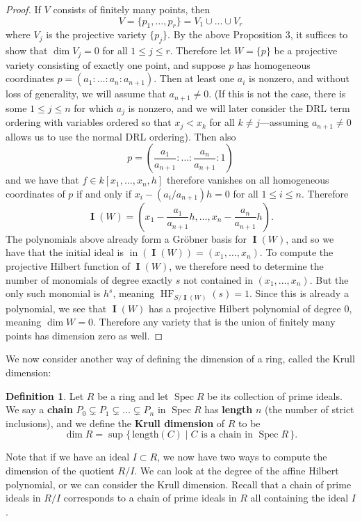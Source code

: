 \documentclass[11pt]{article}
\DeclareMathOperator{\Spec}{Spec}
\DeclareMathOperator{\HF}{HF}
\DeclareMathOperator{\init}{in}
\DeclareMathOperator{\I}{\mathbf{I}}
\theoremstyle{definition}
\newtheorem{definition}{Definition}
\begin{document}
\begin{proof}
	If $V$ consists of finitely many points, then \[ V = \{p_1, \dots, p_r\} = V_1 \cup \dots \cup V_r \] where $V_j$ is the projective variety $\{p_j\}$. By the above Proposition 3, it suffices to show that $\dim V_j = 0$ for all $1 \leq j \leq r$. Therefore let $W = \{p\}$ be a projective variety consisting of exactly one point, and suppose $p$ has homogeneous coordinates $p = (a_1: \dots: a_n: a_{n+1})$. Then at least one $a_i$ is nonzero, and without loss of generality, we will assume that $a_{n + 1} \neq 0$. (If this is not the case, there is some $1 \leq j \leq n$ for which $a_j$ is nonzero, and we will later consider the DRL term ordering with variables ordered so that $x_j < x_k$ for all $k \neq j$---assuming $a_{n + 1} \neq 0$ allows us to use the normal DRL ordering). Then also \[ p = \left( \frac{a_1}{a_{n+1}} : \dots : \frac{a_n}{a_{n+1}} : 1 \right) \] and we have that $f \in k[x_1, \dots, x_n, h]$ therefore vanishes on all homogeneous coordinates of $p$ if and only if $x_i - (a_i/a_{n+1})h = 0$ for all $1 \leq i \leq n$. Therefore \[ \I(W) = \left( x_1 - \frac{a_1}{a_{n+1}} h , \dots, x_n - \frac{a_n}{a_{n+1}}h \right). \] The polynomials above already form a Gröbner basis for $\I(W)$, and so we have that the initial ideal is $\init(\I(W)) = (x_1, \dots, x_n)$. To compute the projective Hilbert function of $\I(W)$, we therefore need to determine the number of monomials of degree exactly $s$ not contained in $(x_1, \dots, x_n)$. But the only such monomial is $h^s$, meaning $\HF_{S/\I(W)}(s) = 1$. Since this is already a polynomial, we see that $\I(W)$ has a projective Hilbert polynomial of degree 0, meaning $\dim W = 0$. Therefore any variety that is the union of finitely many points has dimension zero as well. 
\end{proof}


We now consider another way of defining the dimension of a ring, called the Krull dimension:

\begin{definition}
	Let $R$ be a ring and let $\Spec R$ be its collection of prime ideals. We say a \textbf{chain} $P_0 \subsetneq P_1 \subsetneq \dots \subsetneq P_n$ in $\Spec R$ has \textbf{length} $n$ (the number of strict inclusions), and we define the \textbf{Krull dimension} of $R$ to be \[ \dim R = \sup \{\,\text{length}(C) \mid C \text{ is a chain in } \Spec R\,\}. \]
\end{definition}

Note that if we have an ideal $I \subset R$, we now have two ways to compute the dimension of the quotient $R/I$. We can look at the degree of the affine Hilbert polynomial, or we can consider the Krull dimension. Recall that a chain of prime ideals in $R/I$ corresponds to a chain of prime ideals in $R$ all containing the ideal $I$. 
\end{document}
